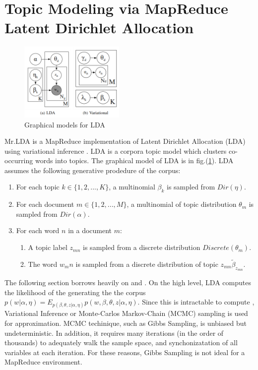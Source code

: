 \documentclass{acm_proc_article-sp}
\begin{document}
\section{Topic Modeling via MapReduce Latent Dirichlet Allocation}\label{sec:mrlda}
\begin{figure}[!htb]
 \centering
 \includegraphics[width=0.45\textwidth]{fig/eqn/lda-variational}
 \caption{Graphical models for LDA}\label{fig:ldagraphical}
\end{figure}

Mr.LDA is a MapReduce implementation of Latent Dirichlet Allocation (LDA) using variational inference \cite{mrlda}. LDA is a corpora topic model which clusters co-occurring words into topics. The graphical model of LDA is in fig.(\ref{fig:ldagraphical}). LDA assumes the following generative prodedure of the corpus:

\begin{enumerate}
\item For each topic $k \in \{1,2,...,K\}$, a multinomial $\beta_k$ is sampled from $Dir(\eta)$.
\item For each document $m \in \{1,2,...,M\}$, a multinomial of topic distribution $\theta_m$ is sampled from $Dir(\alpha)$.
\item For each word $n$ in a document $m$:
\begin{enumerate}
	\item A topic label $z_{mn}$ is sampled from a discrete distribution $Discrete(\theta_m)$.
	\item The word $w_mn$ is sampled from a discrete distribution of topic $z_{mn} \tilde \beta_{z_{mn}}$.
\end{enumerate}
\end{enumerate}

The following section borrows heavily on \cite{Blei03latentdirichlet} and \cite{mrlda}. On the high level, LDA computes the likelihood of the generating the the corpus $p(w | \alpha, \eta) = E_{p(\beta, \theta, z | \alpha, \eta)} p(w, \beta, \theta, z | \alpha, \eta)$. Since this is intractable to compute \cite{Blei03latentdirichlet}, Variational Inference or Monte-Carlos Markov-Chain (MCMC) sampling is used for approximation. MCMC techinique, such as Gibbs Sampling, is unbiased but undeterministic. In addition, it requires many iterations (in the order of thousands) to adequately walk the sample space, and synchonizatation of all variables at each iteration. For these reasons, Gibbs Sampling is not ideal for a MapReduce environment.
\end{document}
